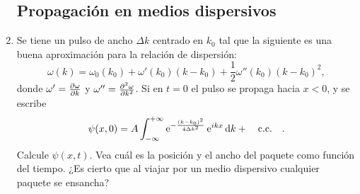 \documentclass[11pt,spanish,a4paper]{article}
\begin{document}
\begin{enumerate}
\subsection*{Propagación en medios dispersivos}

\item Se tiene un pulso de ancho $\Delta k$ centrado en $k_0$ tal que la siguiente es una buena aproximación para la relación de dispersión:
\[
	\omega(k) = \omega_0 (k_0) + \omega'(k_0) (k - k_0) + \frac{1}{2} \omega'' (k_0) ( k - k_0 )^2,
\]
donde \(\omega'= \pdv{\omega}{k}\) y  \(\omega''= \pdv[2]{\omega}{k}\).
Si en $t=0$ el pulso se propaga hacia $x<0$, y se escribe
\[
	\psi(x,0) = A \int_{-\infty}^{+\infty} \operatorname{e}^{ - \frac{ ( k - k_0 )^2 }{ 4 \Delta k^2 } } \operatorname{e}^{ i k x } \dd{k} + \qq{c.c.}.
\]
Calcule $\psi(x,t)$.
Vea cuál es la posición y el ancho del paquete como función del tiempo.
¿Es cierto que al viajar por un medio dispersivo cualquier paquete se ensancha?



\end{enumerate}
\end{document}
